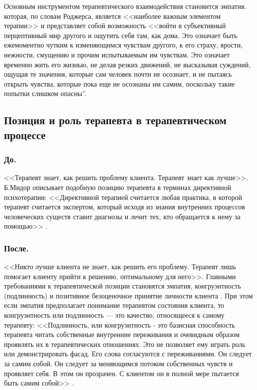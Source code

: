 \documentclass{../../common/thesisbyxetex}
\begin{document}
Основным инструментом терапевтического взаимодействия становится эмпатия. которая, по словам 
Роджерса, является <<наиболее важным элементом терапии>> и представляет собой возможность <<войти в 
субъективный перцептивный мир другого и ощутить себя там, как дома. Это означает быть ежемоментно 
чутким к изменяющимся чувствам другого, к его страху, ярости, нежности, смущению и прочим 
испытываемым им чувствам. Это означает временно жить его жизнью, не делая резких движений, не 
высказывая суждений, ощущая те значения, которые сам человек почти не осознает, и не пытаясь открыть 
чувства, которые пока еще не осознаны им самим, поскольку такие попытки слишком опасны”\cite{rce}.

\subsection*{Позиция и роль терапевта в терапевтическом процессе}

\subsubsection*{До.} 

<<Терапевт знает, как решить проблему клиента. Терапевт знает как лучше>>. Б.Мидор описывает 
подобную позицию терапевта в терминах директивной психотерапии: <<Директивной терапией считается 
любая практика, в которой терапевт считается экспертом, который исходя из знания внутренних 
процессов человеческих существ ставит диагнозы и лечит тех, кто обращается к нему за помощью>> 
\cite{mid}.

\subsubsection*{После.}

<<Никто лучше клиента не знает, как решить его проблему. Терапевт лишь помогает клиенту прийти к 
решению, оптимальному для него>>. Главными требованиями к терапевтической позиции становятся 
эмпатия, конгруэнтность (подлинность) и позитивное безоценочное принятие личности клиента 
\cite{mid}. При этом если эмпатия предполагает понимание терапевтом состояния клиента, то 
конгруэнтность или подлинность --- это качество, относящееся к самому терапевту: <<Подлинность, или 
конгруэнтность - это базисная способность терапевта читать собственные внутренние переживания и 
очевидным образом проявлять их в терапевтических отношениях. Это не позволяет ему играть роль или 
демонстрировать фасад. Его слова согласуются с переживаниями. Он следует за самим собой. Он следует 
за меняющимся потоком собственных чувств и проявляет себя. В этом он прозрачен. С клиентом он в 
полной мере пытается быть самим собой>> \cite{mid}.
\end{document}
